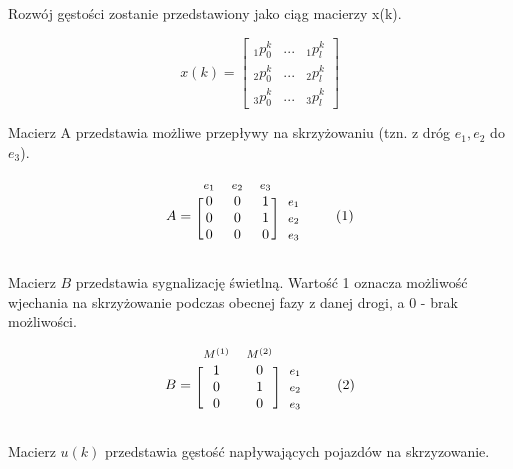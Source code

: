 \documentclass[12pt]{book}
\newcommand\addtag{\refstepcounter{equation}
\tag{\theequation}}
\begin{document}
Rozwój gęstości zostanie przedstawiony jako ciąg macierzy x(k).

\[x(k)= \begin{bmatrix}
_1p^k_0 & ... & _1p^k_l \\
_2p^k_0 & ... & _2p^k_l \\
_3p^k_0 & ... & _3p^k_l 
\end{bmatrix}  \]

Macierz A przedstawia możliwe przepływy na skrzyżowaniu (tzn. z dróg $e_1,e_2$ do $e_3$).

\begin{equation*}
  A=
  \begin{blockarray}{*{3}{c} l}
    \begin{block}{*{3}{>{$\footnotesize}c<{$}} l}
      $e_1$ & $e_2$ & $e_3$ \\
    \end{block}
    \begin{block}{[*{3}{c}]>{$\footnotesize}l<{$}}
       0 & 0 & 1 & $e_1$ \\
       0 & 0 & 1 & $e_2$ \\
       0 & 0 & 0 & $e_3$ \\
    \end{block}
  \end{blockarray} \addtag
\end{equation*}


Macierz $B$ przedstawia sygnalizację świetlną. Wartość 1 oznacza możliwość wjechania na skrzyżowanie podczas obecnej fazy z danej drogi, a 0 - brak możliwości.

\begin{equation*}
  B=
  \begin{blockarray}{*{2}{c} l}
    \begin{block}{*{2}{>{$\footnotesize}c<{$}} l}
      $M^{(1)}$ & $M^{(2)}$ \\
    \end{block}
    \begin{block}{[*{2}{c}]>{$\footnotesize}l<{$}}
       1 & 0 & $e_1$ \\
       0 & 1 & $e_2$ \\
       0 & 0 & $e_3$ \\
    \end{block}
  \end{blockarray} \addtag
\end{equation*}

Macierz $u(k)$ przedstawia gęstość napływających pojazdów  na skrzyzowanie.
\end{document}
